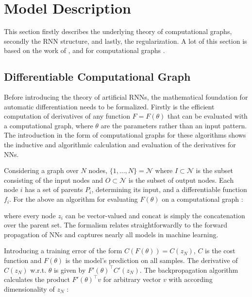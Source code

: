 \chapter{Model Description}

This section firstly describes the underlying theory of computational graphs, secondly the RNN structure, and lastly, the regularization. A lot of this section is based on the work of \textcite{suts}, \textcite{Martens2012} and for computational graphs \textcite{NoceWrig06}.

\section{Differentiable Computational Graph}

Before introducing the theory of artificial RNNs, the mathematical foundation for automatic differentiation needs to be formalized. Firstly is the efficient computation of derivatives of any function $F = F(\theta)$ that can be evaluated with a computational graph, where $\theta$ are the parameters rather than an input pattern. The introduction in the form of computational graphs for these algorithms shows the inductive and algorithmic calculation and evaluation of the derivatives for NNs.

Considering a graph over $N$ nodes, $\{1, ..., N\} = \mathcal{N}$ where $I \subset \mathcal{N}$ is the subset consisting of the input nodes and $O \subset \mathcal{N}$ is the subset of output nodes. Each node $i$ has a set of parents $P_i$, determining its input, and a differentiable function $f_i$. For the above an algorithm for evaluating $F(\theta)$ on a computational graph \cite{suts}:

\begin{algorithmic}[1]
    \EndFor
\end{algorithmic}

\noindent
where every node $z_i$ can be vector-valued and $\text{concat}$ is simply the concatenation over the parent set. The formalism relates straightforwardly to the forward propagation of NNs and captures nearly all models in machine learning.

Introducing a training error of the form $C(F(\theta)) = C(z_N)$, $C$ is the cost function and $F(\theta)$ is the model's prediction on all samples. The derivative of $C(z_N)$ w.r.t. $\theta$ is given by $F'(\theta)^\intercal C'(z_N)$. The backpropagation algorithm calculates the product $F'(\theta)^\intercal v$ for arbitrary vector $v$ with according dimensionality of $z_N$ \cite{suts}:

